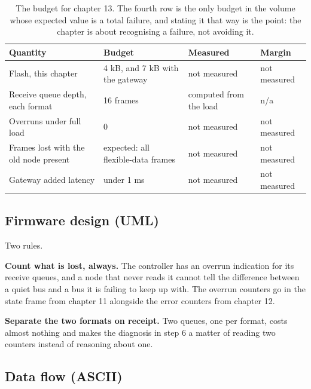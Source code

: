 \begin{table}[H]\centering\small
\begin{tabular}{p{44mm}p{28mm}p{28mm}p{30mm}}
\toprule
Quantity & Budget & Measured & Margin \\
\midrule
Flash, this chapter & 4 kB, and 7 kB with the gateway & not measured & not measured \\
Receive queue depth, each format & 16 frames & computed from the load & n/a \\
Overruns under full load & 0 & not measured & not measured \\
Frames lost with the old node present & expected: all flexible-data frames & not measured & not measured \\
Gateway added latency & under 1 ms & not measured & not measured \\
\bottomrule
\end{tabular}
\caption{The budget for chapter 13. The fourth row is the only budget in the volume whose expected value is a total failure, and stating it that way is the point: the chapter is about recognising a failure, not avoiding it.}
\end{table}

\subsection*{Firmware design (UML)}


Two rules.

\textbf{Count what is lost, always.} The controller has an overrun indication
for its receive queues, and a node that never reads it cannot tell the
difference between a quiet bus and a bus it is failing to keep up with. The
overrun counters go in the state frame from chapter 11 alongside the error
counters from chapter 12.

\textbf{Separate the two formats on receipt.} Two queues, one per format, costs
almost nothing and makes the diagnosis in step 6 a matter of reading two
counters instead of reasoning about one.

\subsection*{Data flow (ASCII)}

